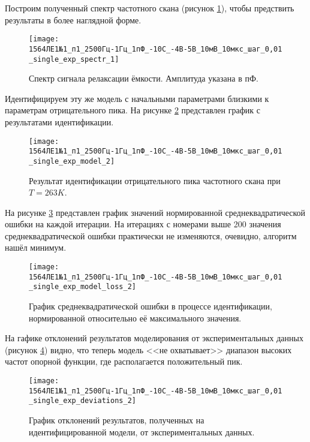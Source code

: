 	Построим полученный спектр частотного скана (рисунок 
	\ref{pic:spectr_monoexp_p_positive_263}), чтобы предствить
	результаты в более наглядной форме.

	\begin{figure}[!htp]
		\centering
		\texttt{[image: 1564ЛЕ1№1\_п1\_2500Гц-1Гц\_1пФ\_-10С\_-4В-5В\_10мВ\_10мкс\_шаг\_0,01\_single\_exp\_spectr\_1]}
		\caption{Спектр сигнала релаксации ёмкости. Амплитуда указана в пФ.}
		\label{pic:spectr_monoexp_p_positive_263}
	\end{figure}

	Идентифицируем эту же модель с начальными параметрами близкими к параметрам
	отрицательного пика. На рисунке \ref{pic:model_monoexp_p_negative_263}
	представлен график с результатами идентификации.

	\begin{figure}[!htp]
		\centering
		\texttt{[image: 1564ЛЕ1№1\_п1\_2500Гц-1Гц\_1пФ\_-10С\_-4В-5В\_10мВ\_10мкс\_шаг\_0,01\_single\_exp\_model\_2]}
		\caption{Результат идентификации отрицательного пика частотного скана
		         при $T=263K$.}
		\label{pic:model_monoexp_p_negative_263}
	\end{figure}

	На рисунке \ref{pic:loss_monoexp_p_negative_263} представлен график значений
	нормированной среднеквадратической ошибки на каждой итерации. На итерациях
	с номерами выше 200 значения среднеквадратической ошибки практически не 
	изменяются, очевидно, алгоритм нашёл минимум.

	\begin{figure}[!htp]
		\centering
		\texttt{[image: 1564ЛЕ1№1\_п1\_2500Гц-1Гц\_1пФ\_-10С\_-4В-5В\_10мВ\_10мкс\_шаг\_0,01\_single\_exp\_model\_loss\_2]}
		\caption{График среднеквадратической ошибки в процессе идентификации,
		         нормированной относительно её максимального значения.}
		\label{pic:loss_monoexp_p_negative_263}
	\end{figure}

	На гафике отклонений результатов моделирования от экспериментальных данных
	(рисунок \ref{pic:deviations_monoexp_p_negative_263}) видно, что теперь 
	модель <<не охватывает>> диапазон высоких частот опорной функции, где
	располагается положительный пик.

	\begin{figure}[!htp]
		\centering
		\texttt{[image: 1564ЛЕ1№1\_п1\_2500Гц-1Гц\_1пФ\_-10С\_-4В-5В\_10мВ\_10мкс\_шаг\_0,01\_single\_exp\_deviations\_2]}
		\caption{График отклонений результатов, полученных на идентифицированной
		модели, от экспериментальных данных.}
		\label{pic:deviations_monoexp_p_negative_263}
	\end{figure}

